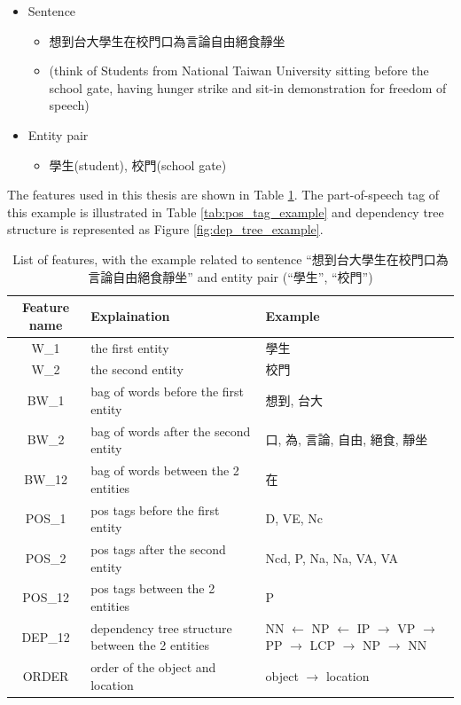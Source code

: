 \begin{itemize}
\item Sentence
    \begin{itemize}
    \item[] 想到台大學生在校門口為言論自由絕食靜坐
    \item[] (think of Students from National Taiwan University sitting before the school gate, having hunger strike and sit-in demonstration for freedom of speech)
    \end{itemize}
\item Entity pair
    \begin{itemize}
    \item[] 學生(student), 校門(school gate)
    \end{itemize}
\end{itemize}

The features used in this thesis are shown in Table \ref{tab:feature_list}.
The part-of-speech tag\cite{Sinica_corpus} of this example is illustrated in Table \ref{tab:pos_tag_example} and dependency tree structure\cite{chang_zh_dep} is represented as Figure \ref{fig:dep_tree_example}\cite{syntree}.

\begin{table}
\begin{center}
\begin{tabular}{| c | m{6cm} | m{6cm} |}
\hline
Feature name    &   Explaination    &   Example\\
\hline\hline
W\_1    &   the first entity    &   學生\\
\hline
W\_2    &   the second entity   &   校門\\
\hline
BW\_1 &   bag of words before the first entity    &   想到, 台大\\
\hline
BW\_2 & bag of words after the second entity  &   口, 為, 言論, 自由, 絕食, 靜坐\\
\hline
BW\_12    &   bag of words between the 2 entities    &   在\\
\hline
POS\_1   &   pos tags before the first entity &   D, VE, Nc\\
\hline
POS\_2   &   pos tags after the second entity    &   Ncd, P, Na, Na, VA, VA\\
\hline
POS\_12  &   pos tags between the 2 entities &   P\\
\hline
DEP\_12  &   dependency tree structure between the 2 entities    &   NN $\leftarrow$ NP $\leftarrow$ IP $\rightarrow$ VP $\rightarrow$ PP $\rightarrow$ LCP $\rightarrow$ NP $\rightarrow$ NN\\
\hline
ORDER   &   order of the object and location    &   object $\rightarrow$ location\\
\hline
\end{tabular}
\captionsetup{width=0.8\textwidth}
\caption[List of features]{List of features, with the example related to sentence ``想到台大學生在校門口為言論自由絕食靜坐'' and entity pair (``學生'', ``校門'')}
\label{tab:feature_list}
\end{center}
\end{table}

